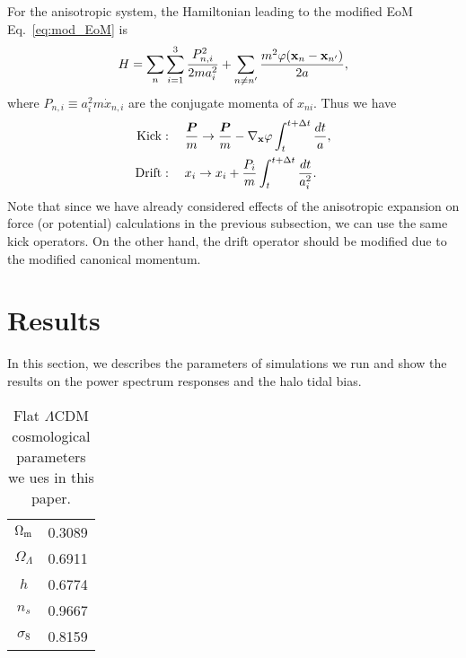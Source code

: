 \documentclass[a4paper,11pt]{article}
\newcommand{\vr}{{\bm r}}
\newcommand{\vP}{{\bm P}}
\begin{document}
For the anisotropic system,
the Hamiltonian leading to the modified EoM Eq.~\eqref{eq:mod_EoM} is
\begin{equation}
    H = \sum_n \sum_{i=1}^3 \frac{P_{n,i}^2}{2 m a_i^2}
    + \sum_{n \neq n'} \frac{m^2 \varphi({\bf x}_n - {\bf x}_{n'})}{2a},
\end{equation}
where $P_{n,i}\equiv a_i^2 m \dot x_{n,i}$ are the conjugate momenta of $x_{ni}$.
Thus we have
\begin{align}
    \mathrm{Kick} &: \quad \frac{\vP}m \to \frac{\vP}m
        - \nabla_{\bf x} \varphi \int_t^{t+\Delta t} \frac{d t}a,  \\
    \mathrm{Drift} &: \quad x_i \to x_i
        + \frac{P_i}{m} \int_t^{t+\Delta t} \frac{d t}{a_i^2}.
\end{align}
Note that since we have already considered effects of the anisotropic expansion
on force (or potential) calculations in the previous subsection, we can use the same kick operators.
On the other hand, the drift operator should be modified due to the modified canonical momentum.





\section{Results}
\label{sec:results}
In this section, we describes the parameters of simulations we run and show the results on the power spectrum responses and the halo tidal bias.

\begin{table}[htb]
  \centering
  \begin{tabular}{|c|c|} \hline
    $\Omega_{\rm m}$ & 0.3089  \\
    $\Omega_\Lambda$ & 0.6911 \\
    $h$ & 0.6774 \\
    $n_s$ & 0.9667 \\
    $\sigma_8$ & 0.8159 \\
    \hline
  \end{tabular}
  \caption{Flat $\Lambda$CDM cosmological parameters we ues in this paper.}
  \label{tab:cosmo_params}
\end{table}
\end{document}

